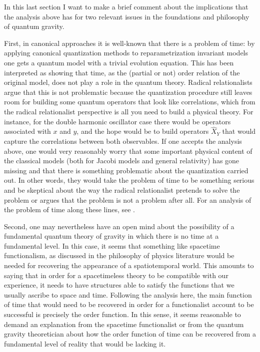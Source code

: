 \documentclass[12 pt]{article}
\begin{document}
In this last section I want to make a brief comment about the implications that the analysis above has for two relevant issues in the foundations and philosophy of quantum gravity.

First, in canonical approaches it is well-known that there is a problem of time: by applying canonical quantization methods to reparametrization invariant models one gets a quantum model with a trivial evolution equation. This has been interpreted as showing that time, as the (partial or not) order relation of the original model, does not play a role in the quantum theory. Radical relationalists argue that this is not problematic because the quantization procedure still leaves room for building some quantum operators that look like correlations, which from the radical relationalist perspective is all you need to build a physical theory. For instance, for the double harmonic oscillator case there would be operators associated with $x$ and $y$, and the hope would be to build operators $\hat{X}_Y$ that would capture the correlations between both observables. If one accepts the analysis above, one would very reasonably worry that some important physical content of the classical models (both for Jacobi models and general relativity) has gone missing and that there is something problematic about the quantization carried out. In other words, they would take the problem of time to be something serious and be skeptical about the way the radical relationalist pretends to solve the problem or argues that the problem is not a problem after all. For an analysis of the problem of time along these lines, see \citep{MozotaFrauca2023}.

Second, one may nevertheless have an open mind about the possibility of a fundamental quantum theory of gravity in which there is no time at a fundamental level. In this case, it seems that something like spacetime functionalism, as discussed in the philosophy of physics literature \citep{Lam2018-LAMSIA-2,Lam2020} would be needed for recovering the appearance of a spatiotemporal world. This amounts to saying that in order for a spacetimeless theory to be compatible with our experience, it needs to have structures able to satisfy the functions that we usually ascribe to space and time. Following the analysis here, the main function of time that would need to be recovered in order for a functionalist account to be successful is precisely the order function. In this sense, it seems reasonable to demand an explanation from the spacetime functionalist or from the quantum gravity theoretician about how the order function of time can be recovered from a fundamental level of reality that would be lacking it. 
\end{document}

